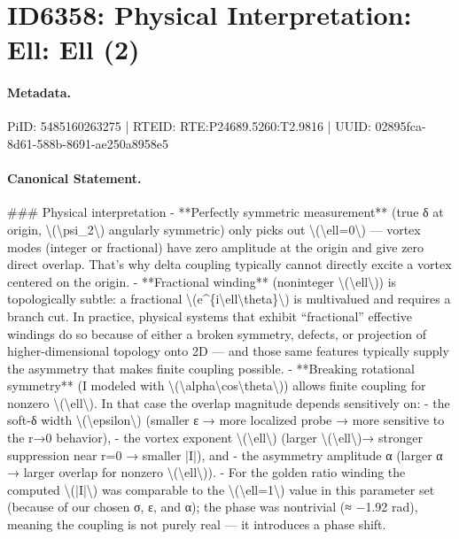\section*{ID6358: Physical Interpretation: Ell: Ell (2)}
\paragraph{Metadata.}
PiID: 5485160263275 | RTEID: RTE:P24689.5260:T2.9816 | UUID: 02895fca-8d61-588b-8691-ae250a8958e5

\paragraph{Canonical Statement.}
\#\#\# Physical interpretation - **Perfectly symmetric measurement** (true δ at origin, \textbackslash{}(\textbackslash{}psi\_2\textbackslash{}) angularly symmetric) only picks out \textbackslash{}(\textbackslash{}ell=0\textbackslash{}) — vortex modes (integer or fractional) have zero amplitude at the origin and give zero direct overlap. That’s why delta coupling typically cannot directly excite a vortex centered on the origin. - **Fractional winding** (noninteger \textbackslash{}(\textbackslash{}ell\textbackslash{})) is topologically subtle: a fractional \textbackslash{}(e\textasciicircum{}\{i\textbackslash{}ell\textbackslash{}theta\}\textbackslash{}) is multivalued and requires a branch cut. In practice, physical systems that exhibit “fractional” effective windings do so because of either a broken symmetry, defects, or projection of higher-dimensional topology onto 2D — and those same features typically supply the asymmetry that makes finite coupling possible. - **Breaking rotational symmetry** (I modeled with \textbackslash{}(\textbackslash{}alpha\textbackslash{}cos\textbackslash{}theta\textbackslash{})) allows finite coupling for nonzero \textbackslash{}(\textbackslash{}ell\textbackslash{}). In that case the overlap magnitude depends sensitively on: - the soft-δ width \textbackslash{}(\textbackslash{}epsilon\textbackslash{}) (smaller ε → more localized probe → more sensitive to the r→0 behavior), - the vortex exponent \textbackslash{}(\textbackslash{}ell\textbackslash{}) (larger \textbackslash{}(\textbackslash{}ell\textbackslash{})→ stronger suppression near r=0 → smaller |I|), and - the asymmetry amplitude α (larger α → larger overlap for nonzero \textbackslash{}(\textbackslash{}ell\textbackslash{})). - For the golden ratio winding the computed \textbackslash{}(|I|\textbackslash{}) was comparable to the \textbackslash{}(\textbackslash{}ell=1\textbackslash{}) value in this parameter set (because of our chosen σ, ε, and α); the phase was nontrivial (≈ −1.92 rad), meaning the coupling is not purely real — it introduces a phase shift.

